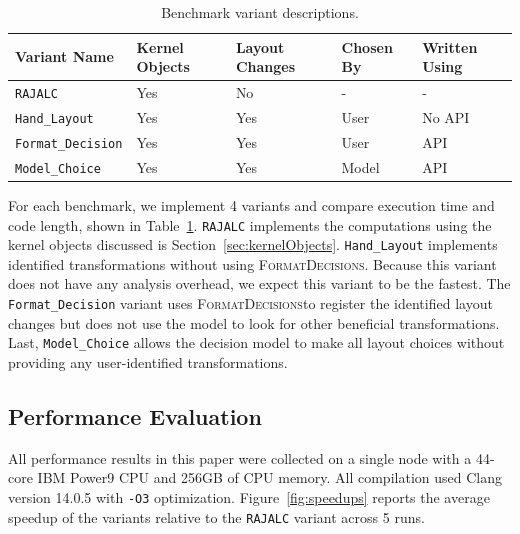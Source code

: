 \documentclass[sigconf,review=true]{acmart}
\newcommand{\FormatDecisions}[0]{{\textsc{FormatDecisions}}}
\begin{document}
\begin{table}
	\centering
	\begin{tabular}{| p{2.4cm} | p{1.1cm} | p{1.1cm} | p{1cm} | p{1cm}|}
		\hline
		 \raggedright Variant \linebreak Name & \raggedright Kernel Objects & \raggedright Layout Changes & \raggedright Chosen By &  Written Using \tabularnewline
		\hline
		\verb.RAJALC. & Yes & No & - & - \\
		\verb.Hand_Layout. & Yes & Yes & User & No API \\
		\verb.Format_Decision. & Yes & Yes & User & API \\
		\verb.Model_Choice. & Yes & Yes & Model & API \\
		\hline
	\end{tabular}
	\caption{Benchmark variant descriptions.}
	\label{VariantDescription}
\end{table}
For each benchmark, we implement 4 variants and compare execution time and code length, shown in Table~\ref{VariantDescription}.
\verb.RAJALC. implements the computations using the kernel objects discussed is Section~\ref{sec:kernelObjects}. 
\verb.Hand_Layout. implements identified transformations without using \FormatDecisions. 
Because this variant does not have any analysis overhead, we expect this variant to be the fastest.
The \verb.Format_Decision. variant uses \FormatDecisions to register the identified layout changes but does not use the model to look for other beneficial transformations.
Last, \verb.Model_Choice. allows the decision model to make all layout choices without providing any user-identified transformations.

\subsection{Performance Evaluation}
All performance results in this paper were collected on a single node with a 44-core IBM Power9 CPU and 256GB of CPU memory.
All compilation used Clang version 14.0.5 with \verb.-O3. optimization.
\label{sec:systemDetails}
Figure~\ref{fig:speedups} reports the average speedup of the variants relative to the \verb.RAJALC. variant across 5 runs. 
\end{document}
